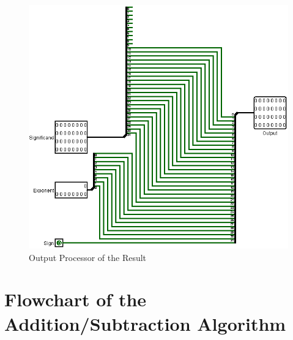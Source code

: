 \documentclass[a4paper,12pt]{article}
\begin{document}
\begin{figure}[htbp]
    \centering
    \includegraphics[width=1\textwidth]{Output.png}
    \caption{Output Processor of the Result}
    \label{Output}
\end{figure}


\section{Flowchart of the Addition/Subtraction Algorithm}


\end{document}
